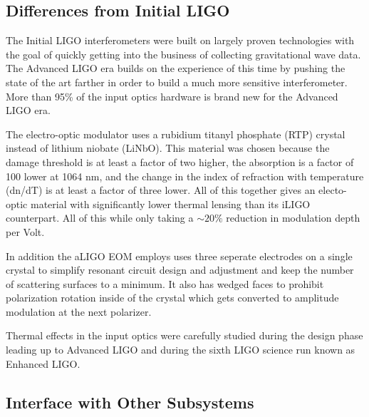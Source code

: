 \subsection{Differences from Initial LIGO}

The Initial LIGO interferometers were built on largely proven technologies with the goal of 
quickly getting into the business of collecting gravitational wave data\cite{Fritschel2003}.  
The Advanced LIGO era builds on the experience of this time by pushing the state of the art 
farther in order to build a much more sensitive interferometer.  
More than 95\% of the input optics hardware is brand new for the Advanced LIGO era.  

The electro-optic modulator uses a rubidium titanyl phosphate (RTP) crystal instead 
of lithium niobate (LiNbO).  
This material was chosen because the damage threshold is at least a factor of two higher, 
the absorption is a factor of 100 lower at 1064 nm, and the change in the index of 
refraction with temperature (dn/dT) is at least a factor of three lower.  
All of this together gives an electo-optic material with significantly lower thermal 
lensing than its iLIGO counterpart.  
All of this while only taking a $\sim20\%$ reduction in modulation depth per Volt.

In addition the aLIGO EOM employs uses three seperate electrodes on a single crystal 
to simplify resonant circuit design and adjustment and keep the number of scattering 
surfaces to a minimum.
It also has wedged faces to prohibit polarization rotation inside of the crystal which 
gets converted to amplitude modulation at the next polarizer.  





Thermal effects in the input optics were carefully studied during the design phase leading up 
to Advanced LIGO and during the sixth LIGO science run known as Enhanced LIGO\cite{Dooley2012}.  



\subsection{Interface with Other Subsystems}

